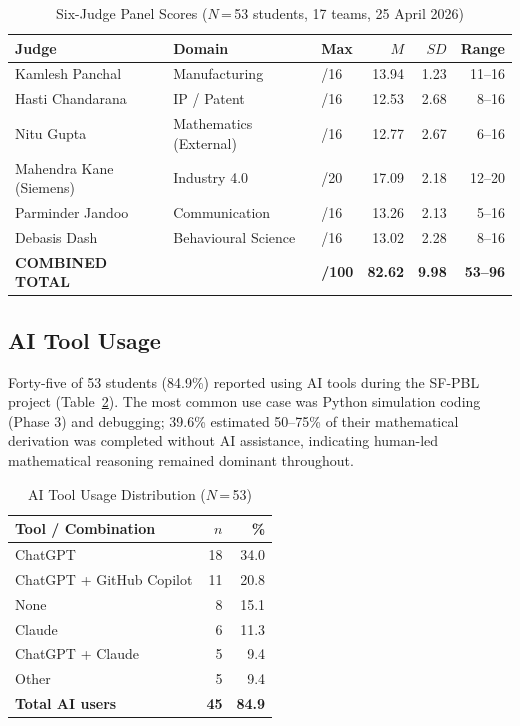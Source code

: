 \documentclass[12pt, a4paper]{article}
\begin{document}
\begin{table}[ht]
\centering
\caption{Six-Judge Panel Scores ($N$\,=\,53 students, 17 teams,
  25 April 2026)}
\label{tab:rubric}
\begin{tabular}{lllrrr}
\toprule
\textbf{Judge} & \textbf{Domain} & \textbf{Max} &
\textbf{$M$} & \textbf{$SD$} & \textbf{Range} \\
\midrule
Kamlesh Panchal         & Manufacturing          & /16 & 13.94 & 1.23 & 11--16 \\
Hasti Chandarana        & IP / Patent            & /16 & 12.53 & 2.68 & 8--16  \\
Nitu Gupta              & Mathematics (External) & /16 & 12.77 & 2.67 & 6--16  \\
Mahendra Kane (Siemens) & Industry 4.0           & /20 & 17.09 & 2.18 & 12--20 \\
Parminder Jandoo        & Communication          & /16 & 13.26 & 2.13 & 5--16  \\
Debasis Dash            & Behavioural Science    & /16 & 13.02 & 2.28 & 8--16  \\
\midrule
\textbf{COMBINED TOTAL} & & \textbf{/100} &
\textbf{82.62} & \textbf{9.98} & \textbf{53--96} \\
\bottomrule
\end{tabular}
\end{table}

\subsection{AI Tool Usage}

Forty-five of 53 students (84.9\%) reported using AI tools during
the SF-PBL project (Table~\ref{tab:ai}). The most common use case
was Python simulation coding (Phase 3) and debugging; 39.6\%
estimated 50--75\% of their mathematical derivation was completed
without AI assistance, indicating human-led mathematical reasoning
remained dominant throughout.

\begin{table}[ht]
\centering
\caption{AI Tool Usage Distribution ($N$\,=\,53)}
\label{tab:ai}
\begin{tabular}{lrr}
\toprule
\textbf{Tool / Combination} & \textbf{$n$} & \textbf{\%} \\
\midrule
ChatGPT                  & 18 & 34.0 \\
ChatGPT + GitHub Copilot & 11 & 20.8 \\
None                     &  8 & 15.1 \\
Claude                   &  6 & 11.3 \\
ChatGPT + Claude         &  5 &  9.4 \\
Other                    &  5 &  9.4 \\
\midrule
\textbf{Total AI users}  & \textbf{45} & \textbf{84.9} \\
\bottomrule
\end{tabular}
\end{table}
\end{document}
